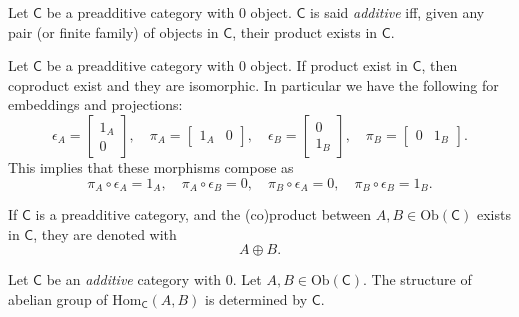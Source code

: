 \begin{defn}
	Let $\mathsf{C}$ be a preadditive category with $0$ object.
	$\mathsf{C}$ is said {\em additive} iff, given any pair (or finite family) of objects in $\mathsf{C}$, their product exists in $\mathsf{C}$.
\end{defn}

\begin{prop}
	Let $\mathsf{C}$ be a preadditive category with $0$ object.
	If product exist in $\mathsf{C}$, then coproduct exist and they are isomorphic.
	In particular we have the following for embeddings and projections:
	\begin{equation}
	\epsilon_A = 
	\begin{bmatrix}
		1_A \\ 0
	\end{bmatrix}, \quad
	\pi_A = 
	\begin{bmatrix}
		1_A & 0
	\end{bmatrix}, \quad
	\epsilon_B = 
	\begin{bmatrix}
		0 \\ 1_B
	\end{bmatrix}, \quad
	\pi_B = 
	\begin{bmatrix}
		0 & 1_B
	\end{bmatrix}
	.\end{equation} 
	This implies that these morphisms compose as
	\begin{equation}
	\pi_A \circ \epsilon_A = 1_A, \quad
	\pi_A \circ \epsilon_B = 0, \quad
	\pi_B \circ \epsilon_A = 0, \quad
	\pi_B \circ \epsilon_B = 1_B
	.\end{equation} 
\end{prop} 

\begin{defn}
	If $\mathsf{C}$ is a preadditive category, and the (co)product between $A, B \in \mathrm{Ob} \left(\mathsf{C}\right)$ exists in $\mathsf{C}$, they are denoted with 
	\begin{equation}
	A \oplus B
	.\end{equation} 
\end{defn}

\begin{prop}
	Let $\mathsf{C}$ be an {\em additive} category with $0$.
	Let $A, B \in \mathrm{Ob} \left(\mathsf{C}\right)$.
	The structure of abelian group of $\mathrm{Hom}_{\mathsf{C}} \left( A, B \right)$ is determined by $\mathsf{C}$.
\end{prop} 

